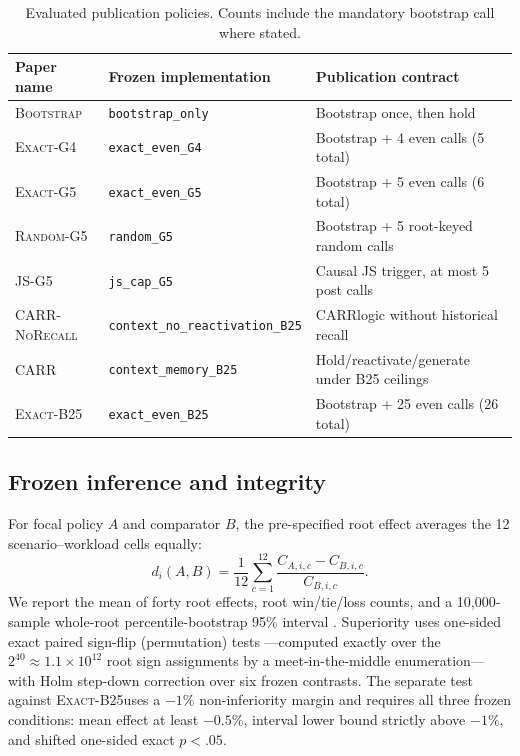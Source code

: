 \documentclass[sigconf,anonymous,review]{acmart}
\newcommand{\carr}{\textsc{CARR}}
\newcommand{\norecall}{\textsc{CARR-NoRecall}}
\newcommand{\bbootstrap}{\textsc{Bootstrap}}
\newcommand{\exactfour}{\textsc{Exact-G4}}
\newcommand{\exactfive}{\textsc{Exact-G5}}
\newcommand{\randomfive}{\textsc{Random-G5}}
\newcommand{\jsfive}{\textsc{JS-G5}}
\newcommand{\exactdense}{\textsc{Exact-B25}}
\begin{document}
\begin{table}[t]
\caption{Evaluated publication policies. Counts include the mandatory
bootstrap call where stated.}
\label{tab:policies}
\centering
\small
\begin{tabular}{lll}
\toprule
Paper name & Frozen implementation & Publication contract \\
\midrule
\bbootstrap & \texttt{bootstrap\_only} & Bootstrap once, then hold \\
\exactfour & \texttt{exact\_even\_G4} & Bootstrap + 4 even calls (5 total) \\
\exactfive & \texttt{exact\_even\_G5} & Bootstrap + 5 even calls (6 total) \\
\randomfive & \texttt{random\_G5} & Bootstrap + 5 root-keyed random calls \\
\jsfive & \texttt{js\_cap\_G5} & Causal JS trigger, at most 5 post calls \\
\norecall & \texttt{context\_no\_reactivation\_B25} & \carr logic without historical recall \\
\carr & \texttt{context\_memory\_B25} & Hold/reactivate/generate under B25 ceilings \\
\exactdense & \texttt{exact\_even\_B25} & Bootstrap + 25 even calls (26 total) \\
\bottomrule
\end{tabular}
\end{table}

\subsection{Frozen inference and integrity}

For focal policy $A$ and comparator $B$, the pre-specified root effect averages
the 12 scenario--workload cells equally:
\begin{equation}
 d_i(A,B)=\frac{1}{12}\sum_{c=1}^{12}
 \frac{C_{A,i,c}-C_{B,i,c}}{C_{B,i,c}}.
\end{equation}
We report the mean of forty root effects, root win/tie/loss counts, and a
10,000-sample whole-root percentile-bootstrap 95\% interval
\cite{efron1993bootstrap}. Superiority uses one-sided exact paired sign-flip
(permutation) tests \cite{good2005permutation}---computed exactly over the
$2^{40}\approx1.1\times10^{12}$ root sign assignments by a meet-in-the-middle
enumeration---with Holm step-down correction \cite{holm1979} over six frozen
contrasts. The separate test against \exactdense uses a $-1\%$ non-inferiority
margin \cite{wellek2010noninferiority} and requires all three frozen
conditions: mean effect at least $-0.5\%$, interval lower bound strictly above
$-1\%$, and shifted one-sided exact $p<.05$.
\end{document}
